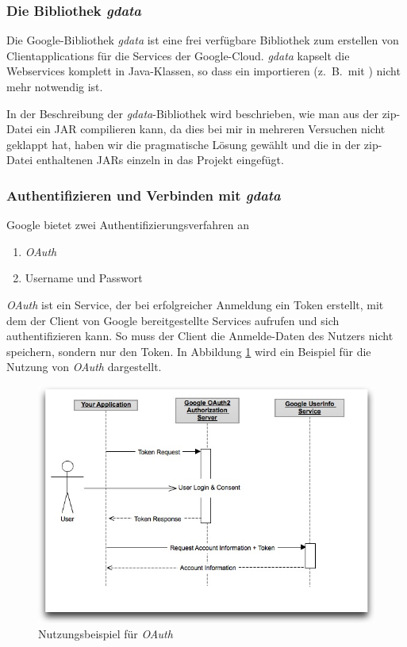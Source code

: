 \javalstset{}{}
\FloatBarrier
\subsubsection{Die Bibliothek \emph{gdata}}
Die Google-Bibliothek \emph{gdata} ist eine frei verf\"ugbare Bibliothek zum erstellen von
 Clientapplications für die Services der Google-Cloud.
\emph{gdata} kapselt die Webservices komplett in Java-Klassen, so dass ein importieren
 (z.\ B.\ mit \wsimport) nicht mehr notwendig ist.

In der Beschreibung der \emph{gdata}-Bibliothek wird beschrieben, wie man aus der zip-Datei
 ein JAR compilieren kann, da dies bei mir in mehreren Versuchen nicht geklappt hat,
 haben wir die pragmatische Lösung gewählt und die in der zip-Datei enthaltenen JARs einzeln
 in das Projekt eingefügt\cite{GO02}.
\FloatBarrier
\subsubsection{Authentifizieren und Verbinden mit \emph{gdata}}
Google bietet zwei Authentifizierungsverfahren an
\begin{enumerate}
	\item\emph{OAuth}
	\item Username und Passwort
\end{enumerate}
\emph{OAuth} ist ein Service, der bei erfolgreicher Anmeldung ein Token erstellt, mit dem
 der Client von Google bereitgestellte Services aufrufen und sich authentifizieren kann.
So muss der Client die Anmelde-Daten des Nutzers nicht speichern, sondern nur den Token.
In Abbildung \ref{fig:google_oauth} wird ein Beispiel f\"ur die Nutzung von \emph{OAuth}
 dargestellt.
\begin{figure}[h!]
\includegraphics[width=\textwidth]{Bilder/googleOauth.jpg}
\caption{Nutzungsbeispiel f\"ur \emph{OAuth}\cite{GO01}}
\label{fig:google_oauth}
\end{figure}

